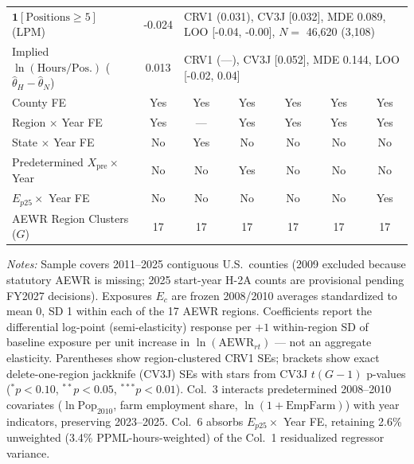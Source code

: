 \begin{table}[!htbp]
\begin{tabular}{lcccccc}
$\mathbf{1}[\text{Positions} \ge 5]$ (LPM) & -0.024 & \multicolumn{5}{l}{CRV1 (0.031), CV3J [0.032], MDE 0.089, LOO [-0.04, -0.00], $N=$ 46,620 (3,108)} \\
Implied $\ln(\text{Hours/Pos.})$ ($\hat{\theta}_H - \hat{\theta}_N$) & 0.013 & \multicolumn{5}{l}{CRV1 (---), CV3J [0.052], MDE 0.144, LOO [-0.02, 0.04]} \\
\midrule
County FE & Yes & Yes & Yes & Yes & Yes & Yes \\
Region $\times$ Year FE & Yes & --- & Yes & Yes & Yes & Yes \\
State $\times$ Year FE & No & Yes & No & No & No & No \\
Predetermined $X_{\text{pre}} \times$ Year & No & No & Yes & No & No & No \\
$E_{p25} \times$ Year FE & No & No & No & No & No & Yes \\
AEWR Region Clusters ($G$) & 17 & 17 & 17 & 17 & 17 & 17 \\
\bottomrule
\end{tabular}
\begin{minipage}{0.96\linewidth}
\vspace{0.4em}\footnotesize
\textit{Notes:} Sample covers 2011--2025 contiguous U.S.\ counties (2009 excluded because statutory AEWR is missing; 2025 start-year H-2A counts are provisional pending FY2027 decisions). Exposures $E_c$ are frozen 2008/2010 averages standardized to mean 0, SD 1 within each of the 17 AEWR regions. Coefficients report the differential log-point (semi-elasticity) response per $+1$ within-region SD of baseline exposure per unit increase in $\ln(\text{AEWR}_{rt})$ — not an aggregate elasticity. Parentheses show region-clustered CRV1 SEs; brackets show exact delete-one-region jackknife (CV3J) SEs with stars from CV3J $t(G-1)$ p-values ($^{*}p<0.10$, $^{**}p<0.05$, $^{***}p<0.01$). Col.\ 3 interacts predetermined 2008--2010 covariates ($\ln\text{Pop}_{2010}$, farm employment share, $\ln(1+\text{EmpFarm})$) with year indicators, preserving 2023--2025. Col.\ 6 absorbs $E_{p25} \times$ Year FE, retaining 2.6\% unweighted (3.4\% PPML-hours-weighted) of the Col.\ 1 residualized regressor variance.
\end{minipage}
\end{table}
